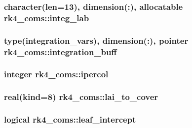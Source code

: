 \subsubsection[{integ\+\_\+lab}]{\setlength{\rightskip}{0pt plus 5cm}character(len=13), dimension(\+:), allocatable rk4\+\_\+coms\+::integ\+\_\+lab}\label{namespacerk4__coms_a4f5c8dc79c821a459a356f283b4831c8}
\hypertarget{namespacerk4__coms_a3c62cf3b7294822d789a72c33ed42538}{}
\subsubsection[{integration\+\_\+buff}]{\setlength{\rightskip}{0pt plus 5cm}type({\bf integration\+\_\+vars}), dimension(\+:), pointer rk4\+\_\+coms\+::integration\+\_\+buff}\label{namespacerk4__coms_a3c62cf3b7294822d789a72c33ed42538}
\hypertarget{namespacerk4__coms_a49c5428026d0aece9bcf4f9a87c7b823}{}
\subsubsection[{ipercol}]{\setlength{\rightskip}{0pt plus 5cm}integer rk4\+\_\+coms\+::ipercol}\label{namespacerk4__coms_a49c5428026d0aece9bcf4f9a87c7b823}
\hypertarget{namespacerk4__coms_a5af034bb3daf3fd270550fe26a843ced}{}
\subsubsection[{lai\+\_\+to\+\_\+cover}]{\setlength{\rightskip}{0pt plus 5cm}real(kind=8) rk4\+\_\+coms\+::lai\+\_\+to\+\_\+cover}\label{namespacerk4__coms_a5af034bb3daf3fd270550fe26a843ced}
\hypertarget{namespacerk4__coms_ab6eb51e1fa8b861cc6fb6359631bdec3}{}
\subsubsection[{leaf\+\_\+intercept}]{\setlength{\rightskip}{0pt plus 5cm}logical rk4\+\_\+coms\+::leaf\+\_\+intercept}\label{namespacerk4__coms_ab6eb51e1fa8b861cc6fb6359631bdec3}
\hypertarget{namespacerk4__coms_a9fc78b38e070c62f9669f9db9d966784}{}
